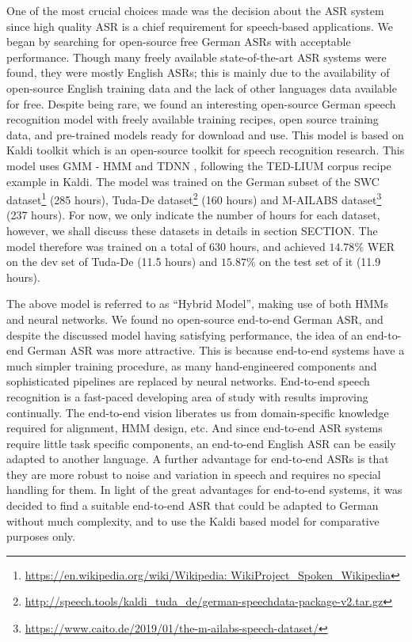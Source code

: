 One of the most crucial choices made was the decision about the \ac{ASR} system since high quality \ac{ASR} is a chief requirement for speech-based applications. We began by searching for open-source free German \ac{ASR}s with acceptable performance. Though many freely available state-of-the-art \ac{ASR} systems were found, they were mostly English \ac{ASR}s; this is mainly due to the availability of open-source English training data and the lack of other languages data available for free. Despite being rare, we found an interesting open-source German speech recognition model \cite{milde2018open} with freely available training recipes, open source training data, and pre-trained models ready for download and use. This model is based on Kaldi toolkit \cite{daniel2011kaldi} which is an open-source toolkit for speech recognition research. This model \cite{milde2018open} uses \ac{GMM} - \acf{HMM} and \ac{TDNN} \cite{waibel1990readings} \cite{peddinti2015time}, following the TED-LIUM corpus recipe example \cite{rousseau2014enhancing} in Kaldi. The model \cite{milde2018open} was trained on the German subset of the \ac{SWC} dataset\footnote{\url{https://en.wikipedia.org/wiki/Wikipedia: WikiProject_Spoken_Wikipedia}} (285 hours), Tuda-De dataset\footnote{\url{http://speech.tools/kaldi_tuda_de/german-speechdata-package-v2.tar.gz}} \cite{radeck2015open} (160 hours) and M-AILABS dataset\footnote{\url{https://www.caito.de/2019/01/the-m-ailabs-speech-dataset/}} (237 hours). For now, we only indicate the number of hours for each dataset, however, we shall discuss these datasets in details in section SECTION. The model therefore was trained on a total of 630 hours, and achieved $14.78\%$ \ac{WER} on the dev set of Tuda-De (11.5 hours) and $15.87\%$ on the test set of it (11.9 hours).


The above model \cite{milde2018open} is referred to as \enquote{Hybrid Model}, making use of both \ac{HMM}s and neural networks. We found no open-source end-to-end German \ac{ASR}, and despite the discussed model \cite{milde2018open} having satisfying performance, the idea of an end-to-end German \ac{ASR} was more attractive. This is because end-to-end systems have a much simpler training procedure, as many hand-engineered components and sophisticated pipelines are replaced by neural networks. End-to-end speech recognition is a fast-paced developing area of study with results improving continually. The end-to-end vision liberates us from domain-specific knowledge required for alignment, \ac{HMM} design, etc. And since end-to-end \ac{ASR} systems require little task specific components, an end-to-end English \ac{ASR} can be easily adapted to another language. A further advantage for end-to-end \ac{ASR}s is that they are more robust to noise and variation in speech and requires no special handling for them. In light of the great advantages for end-to-end systems, it was decided to find a suitable end-to-end \ac{ASR} that could be adapted to German without much complexity, and to use the Kaldi based model \cite{milde2018open} for comparative purposes only.



